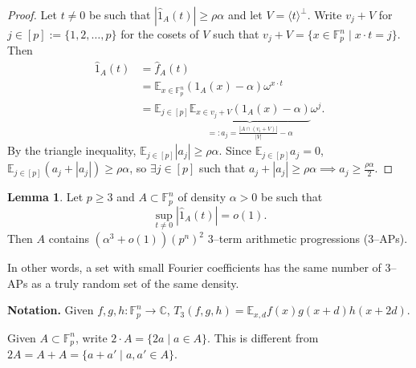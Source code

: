 \documentclass{article}
\theoremstyle{definition}
\newtheorem{lemma}[theorem]{Lemma}
\begin{document}
\begin{proof}
    Let $t\neq 0$ be such that $|\hat{1}_A(t)|\ge \rho \alpha$ and let $V = \langle t \rangle^{\perp}$. Write $v_j + V$ for $j \in [p] := \{1,2,\ldots,p\}$ for the cosets of $V$ such that $v_j + V = \{x \in \mathbb{F}_p^n \mid x \cdot t = j\}$. Then 
    \begin{align*}
        \hat{1}_A(t) &= \hat{f}_A(t) \\
        &= \mathbb{E}_{x \in \mathbb{F}_p^n}(1_A(x)-\alpha)\omega^{x \cdot t} \\
        &= \mathbb{E}_{j \in [p]}\underbrace{\mathbb{E}_{x \in v_j+V}(1_A(x)-\alpha)}_{=: a_j = \frac{|A \cap (v_i +V)|}{|V|}-\alpha}\omega^j.
    \end{align*}
    By the triangle inequality, $\mathbb{E}_{j \in [p]} |a_j|\ge \rho \alpha$. Since $\mathbb{E}_{j \in [p]}a_j = 0$, $\mathbb{E}_{j \in [p]}(a_j + |a_j|) \ge \rho \alpha$, so $\exists j \in [p]$ such that $a_j + |a_j| \ge \rho \alpha \implies a_j \ge \frac{\rho \alpha}{2}$.
\end{proof}


\begin{lemma}\label{lemma1.16}
    Let $p\ge 3$ and $A \subset \mathbb{F}_p^n$ of density $\alpha > 0$ be such that $$\sup_{t \neq 0} |\hat{1}_A(t)| = o(1).$$ Then $A$ contains $(\alpha^3+o(1))(p^n)^2$ 3--term arithmetic progressions (3--APs).
\end{lemma}
In other words, a set with small Fourier coefficients has the same number of 3--APs as a truly random set of the same density.
\vspace{1mm}
 
\textbf{Notation.} Given $f,g,h : \mathbb{F}_p^n \to \mathbb{C}$, $T_3(f,g,h) = \mathbb{E}_{x,d} f(x)g(x+d)h(x+2d)$. 

\vspace{1mm}
 
Given $A \subset \mathbb{F}_p^n$, write $2 \cdot A = \{2a \mid a \in A\}$. This is different from $2A = A + A =\{a + a' \mid a,a' \in A\}$.
\end{document}
